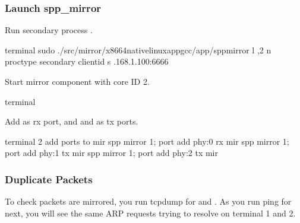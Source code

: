 \documentclass[a4paper,11pt,openany,oneside,english]{sphinxmanual}
\begin{document}
\subsubsection{Launch spp\_mirror}
\label{\detokenize{usecases/spp_mirror:launch-spp-mirror}}
Run secondary process .

\begin{sphinxVerbatim}[commandchars=\\\{\},formatcom=\footnotesize]
 terminal 
 sudo ./src/mirror/x86\PYGZus{}64\PYGZhy{}native\PYGZhy{}linuxapp\PYGZhy{}gcc/app/spp\PYGZus{}mirror 
 \PYGZhy{}l ,2 \PYGZhy{}n  
 \PYGZhy{}\PYGZhy{}proc\PYGZhy{}type secondary 
 \PYGZhy{}\PYGZhy{} 
 \PYGZhy{}\PYGZhy{}client\PYGZhy{}id  
 \PYGZhy{}s .168.1.100:6666 
\end{sphinxVerbatim}

Start mirror component with core ID 2.

\begin{sphinxVerbatim}[commandchars=\\\{\},formatcom=\footnotesize]
 terminal 
\end{sphinxVerbatim}

Add  as rx port, and  and  as tx ports.

\begin{sphinxVerbatim}[commandchars=\\\{\},formatcom=\footnotesize]
\PYGZsh{} terminal 2
\PYGZsh{} add ports to mir
spp \PYGZgt{} mirror 1; port add phy:0 rx mir
spp \PYGZgt{} mirror 1; port add phy:1 tx mir
spp \PYGZgt{} mirror 1; port add phy:2 tx mir
\end{sphinxVerbatim}


\subsubsection{Duplicate Packets}
\label{\detokenize{usecases/spp_mirror:id1}}
To check packets are mirrored, you run tcpdump for  and .
As you run ping for  next, you will see the same ARP requests trying
to resolve  on terminal 1 and 2.
\end{document}

